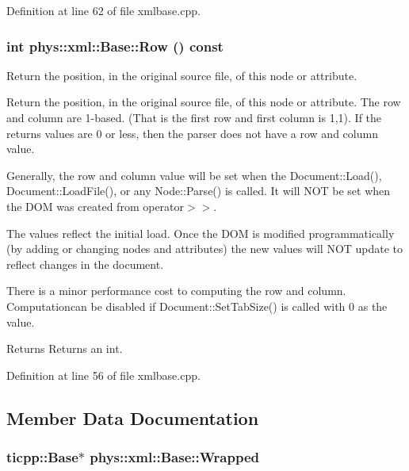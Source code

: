 Definition at line 62 of file xmlbase.cpp.

\hypertarget{classphys_1_1xml_1_1Base_adc2f732f1f37ef7bae5b701a84470754}{
\subsubsection[{Row}]{\setlength{\rightskip}{0pt plus 5cm}int phys::xml::Base::Row () const}}
\label{df/d10/classphys_1_1xml_1_1Base_adc2f732f1f37ef7bae5b701a84470754}


Return the position, in the original source file, of this node or attribute. 

Return the position, in the original source file, of this node or attribute. The row and column are 1-\/based. (That is the first row and first column is 1,1). If the returns values are 0 or less, then the parser does not have a row and column value. \par
 \par
 Generally, the row and column value will be set when the Document::Load(), Document::LoadFile(), or any Node::Parse() is called. It will NOT be set when the DOM was created from operator$>$$>$. \par
 \par
 The values reflect the initial load. Once the DOM is modified programmatically (by adding or changing nodes and attributes) the new values will NOT update to reflect changes in the document. \par
 \par
 There is a minor performance cost to computing the row and column. Computationcan be disabled if Document::SetTabSize() is called with 0 as the value. \begin{DoxyReturn}{Returns}
Returns an int. 
\end{DoxyReturn}


Definition at line 56 of file xmlbase.cpp.



\subsection{Member Data Documentation}
\hypertarget{classphys_1_1xml_1_1Base_a95edc995971b4ed433945a1a8843127e}{
\subsubsection[{Wrapped}]{\setlength{\rightskip}{0pt plus 5cm}ticpp::Base$\ast$ {\bf phys::xml::Base::Wrapped}}}
\label{df/d10/classphys_1_1xml_1_1Base_a95edc995971b4ed433945a1a8843127e}


